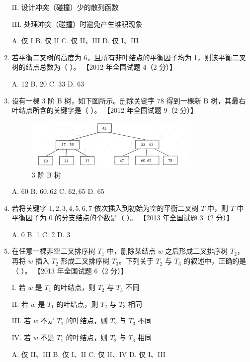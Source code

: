 \documentclass[lang=cn,newtx,10pt,scheme=chinese]{elegantbook}
\begin{document}
\begin{enumerate}
    II. 设计冲突（碰撞）少的散列函数  

    III. 处理冲突（碰撞）时避免产生堆积现象 

    A. 仅 I \quad B. 仅 II \quad C. 仅 II、III \quad D. 仅 I、III  

    \item 若平衡二叉树的高度为 6，且所有非叶结点的平衡因子均为 1，则该平衡二叉树的结点总数为（ ）。  
    【2012 年全国试题 4（2 分）】  

    A. 12 \quad B. 20 \quad C. 33 \quad D. 63  

    \item 设有一棵 3 阶 B 树，如下图所示。删除关键字 78 得到一棵新 B 树，其最右叶结点所含的关键字是（ ）。  
    【2012 年全国试题 9（2 分）】  

    \begin{figure}[h!]
        \centering
        \includegraphics[width=0.8\textwidth]{./figure/exercisePicPDF/chapter9/9-18.pdf}
        \caption{3 阶 B 树}
    \end{figure}

    A. 60 \quad B. $60, 62$ \quad C. $62, 65$ \quad D. 65  

    \item 若将关键字 $1, 2, 3, 4, 5, 6, 7$ 依次插入到初始为空的平衡二叉树 $T$ 中，则 $T$ 中平衡因子为 0 的分支结点的个数是（ ）。  
    【2013 年全国试题 3（2 分）】 

    A. 0 \quad B. 1 \quad C. 2 \quad D. 3  

    \item 在任意一棵非空二叉排序树 $T_1$ 中，删除某结点 $w$ 之后形成二叉排序树 $T_2$，再将 $w$ 插入 $T_2$ 形成二叉排序树 $T_3$。下列关于 $T_2$ 与 $T_3$ 的叙述中，正确的是（ ）。  
    【2013 年全国试题 6（2 分）】  

    I. 若 $w$ 是 $T_1$ 的叶结点，则 $T_2$ 与 $T_3$ 不同 

    II. 若 $w$ 是 $T_1$ 的叶结点，则 $T_2$ 与 $T_3$ 相同  

    III. 若 $w$ 不是 $T_1$ 的叶结点，则 $T_2$ 与 $T_3$ 不同 

    IV. 若 $w$ 不是 $T_1$ 的叶结点，则 $T_2$ 与 $T_3$ 相同  

    A. 仅 II、III \quad B. 仅 I、II \quad C. 仅 II、IV \quad D. 仅 I、III  


\end{enumerate}
\end{document}
